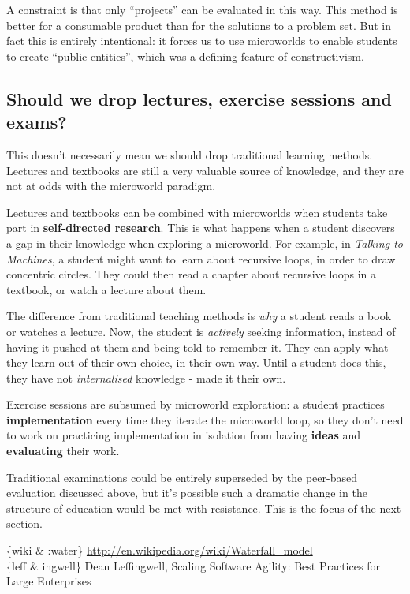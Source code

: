 A constraint is that only ``projects'' can be evaluated in this way.
This method is better for a consumable product than for the solutions to
a problem set. But in fact this is entirely intentional: it forces us to
use microworlds to enable students to create ``public entities'', which
was a defining feature of constructivism.

\subsection{Should we drop lectures, exercise sessions and exams?}

This doesn't necessarily mean we should drop traditional learning
methods. Lectures and textbooks are still a very valuable source of
knowledge, and they are not at odds with the microworld paradigm.

Lectures and textbooks can be combined with microworlds when students
take part in \textbf{self-directed research}. This is what happens when
a student discovers a gap in their knowledge when exploring a
microworld. For example, in \emph{Talking to Machines}, a student might
want to learn about recursive loops, in order to draw concentric
circles. They could then read a chapter about recursive loops in a
textbook, or watch a lecture about them.

The difference from traditional teaching methods is \emph{why} a student
reads a book or watches a lecture. Now, the student is \emph{actively}
seeking information, instead of having it pushed at them and being told
to remember it. They can apply what they learn out of their own choice,
in their own way. Until a student does this, they have not
\emph{internalised} knowledge - made it their own.

Exercise sessions are subsumed by microworld exploration: a student
practices \textbf{implementation} every time they iterate the microworld
loop, so they don't need to work on practicing implementation in
isolation from having \textbf{ideas} and \textbf{evaluating} their work.

Traditional examinations could be entirely superseded by the peer-based
evaluation discussed above, but it's possible such a dramatic change in
the structure of education would be met with resistance. This is the
focus of the next section.

{%
}
{%
\FL
\{wiki & :water\}
\href{http://en.wikipedia.org/wiki/Waterfall\_model}{http://en.wikipedia.org/wiki/Waterfall\_model}
\\\noalign{\medskip}
\{leff & ingwell\} Dean Leffingwell, Scaling Software Agility: Best
Practices for Large Enterprises
\LL
}
